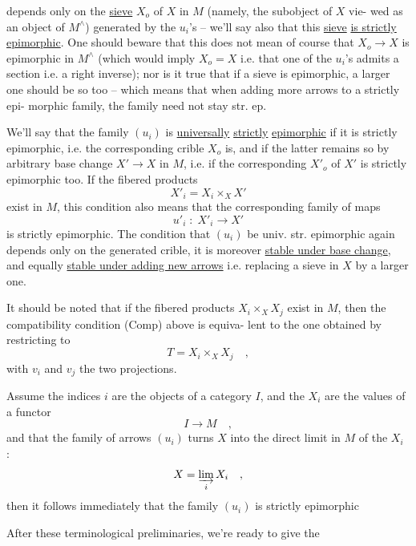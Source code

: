 
depends only on the \uline{sieve} $X_o$ of $X$ in $M$ (namely, the subobject of $X$\hand{,} vie-%
wed as an object of $M^\wedge$) generated by the $u_i$'s -- we'll say also that
this \uline{sieve} \uline{is strictly epimorphic}. One should beware that this does not
mean of course that $X_o \rightarrow X$ is epimorphic in $M^\wedge$ (which would imply $X_o=X$
i.e. that one of the $u_i$'s admits a section i.e. a right inverse); nor
is it true that if a sieve is  epimorphic, a larger one should be 
so too -- which means that when adding more arrows to a strictly epi-%
morphic family, the family need  not stay str. ep.

We'll say that the family $(u_i)$ is \uline{universally} \uline{strictly} \uline{epimorphic}
if it is strictly epimorphic, i.e. the corresponding crible $X_o$ is, and
if the latter remains so by arbitrary base change $X' \rightarrow X$ in $M$, i.e.
if the corresponding   $X'_o$ of $X'$ is strictly epimorphic too. If the
fibered products 
\[ X'_i = X_i \times_X X' \]
exist in $M$, this condition also means that the corresponding family
of maps
\[ u'_i \; : \; X'_i \longrightarrow X' \]
is strictly epimorphic. The condition  that $(u_i)$ be  univ. str.
epimorphic again depends only on the generated crible, it is moreover
\uline{stable under base change}, and equally \uline{stable under adding new arrows}
i.e. replacing a sieve in $X$ by a larger one.

It should be noted that if the fibered products  $X_i \times_X X_j$
exist in $M$, then the compatibility condition (Comp) above is equiva-%
lent to the one obtained by restricting to 
\[ T = X_i \times_X X_j \quad , \]
with $v_i$ and $v_j$ the two projections.

 Assume the indices $i$ are the objects of a category $I$, and the
$X_i$ are the values of a functor
\[ I \longrightarrow M \quad , \]
and that the family of arrows $(u_i)$ turns $X$ into the direct limit in $M$
of the $X_i$ :
\[ X = \varinjlim_i X_i \quad , \]
then it follows immediately that the family $(u_i)$ is strictly epimorphic

After these terminological preliminaries, we're ready to give the

